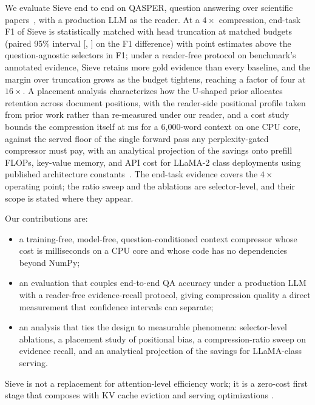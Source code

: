\documentclass{article}
\newcommand{\method}{Sieve}
\begin{document}
We evaluate \method{} end to end on QASPER, question answering over
scientific papers~\citep{dasigi2021qasper}, with a production LLM as
the reader. At a $4\times$ compression, end-task F1 of \method{} is
statistically matched with head truncation at matched budgets
(paired 95\% interval [\PairSieveHeadFlo, \PairSieveHeadFhi] on the
F1 difference) with point estimates above the question-agnostic
selectors in F1; under a reader-free protocol on
benchmark's annotated evidence, \method{} retains more gold evidence
than every baseline, and the margin over truncation grows as the
budget tightens, reaching a factor of four at $16\times$. A
placement analysis characterizes how the U-shaped prior allocates
retention across document positions, with the reader-side positional
profile taken from prior work rather than re-measured under our reader,
and a cost study bounds the
compression itself at \TimeSieveSixk{} ms for a 6{,}000-word
context on one CPU core, against the served floor of the single forward
pass any perplexity-gated compressor must pay, with an analytical
projection of the savings onto prefill FLOPs, key-value memory, and API
cost for LLaMA-2 class deployments using published architecture
constants~\citep{touvron2023llama}. The end-task evidence covers the
$4\times$ operating point; the ratio sweep and the ablations are
selector-level, and their scope is stated where they appear.

Our contributions are:
\begin{itemize}
\item a training-free, model-free, question-conditioned context
compressor whose cost is milliseconds on a CPU core and whose code has
no dependencies beyond NumPy;
\item an evaluation that couples end-to-end QA accuracy under a
production LLM with a reader-free evidence-recall protocol, giving
compression quality a direct measurement that confidence intervals can
separate;
\item an analysis that ties the design to measurable phenomena:
selector-level ablations, a placement study of positional bias, a
compression-ratio sweep on evidence recall, and an analytical projection
of the savings for LLaMA-class serving.
\end{itemize}

\method{} is not a replacement for attention-level efficiency work; it
is a zero-cost first stage that composes with KV cache eviction
\citep{zhang2023h2o,xiao2023streaming} and serving optimizations
\citep{dao2022flashattention,kwon2023vllm}.
\end{document}
